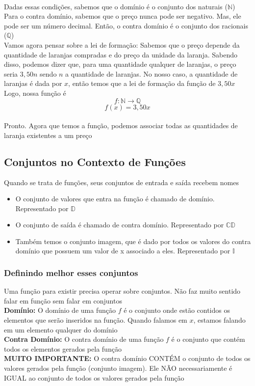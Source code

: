 \documentclass{article}
\begin{document}
\\[2pt]
Dadas essas condições, sabemos que o domínio é o conjunto dos naturais ($\mathbb{N}$)
\\[2pt]
Para o contra domínio, sabemos que o preço nunca pode ser negativo. Mas, ele pode ser um número decimal. Então, o contra domínio é o conjunto dos racionais ($\mathbb{Q}$)
\\[5pt]
Vamos agora pensar sobre a lei de formação: Sabemos que o preço depende da quantidade de laranjas compradas e do preço da unidade da laranja. Sabendo disso, podemos dizer que, para uma quantidade qualquer de laranjas, o preço seria $3,50n$ sendo $n$ a quantidade de laranjas. No nosso caso, a quantidade de laranjas é dada por $x$, então temos que a lei de formação da função de $3,50x$
\\[5pt]
Logo, nossa função é
\[
f: \mathbb{N} \rightarrow \mathbb{Q}
\]
\[
f(x) = 3,50x
\]
\\[5pt]
Pronto. Agora que temos a função, podemos associar todas as quantidades de laranja existentes a um preço

\subsection{Conjuntos no Contexto de Funções}
Quando se trata de funções, seus conjuntos de entrada e saída recebem nomes
\begin{itemize}
    \item O conjunto de valores que entra na função é chamado de domínio. Representado por $\mathbb{D}$

    \item O conjunto de saída é chamado de contra domínio. Representado por $\mathbb{CD}$

    \item Também temos o conjunto imagem, que é dado por todos os valores do contra domínio que possuem um valor de x associado a eles. Representado por $\mathbb{I}$
\end{itemize}

\subsubsection{Definindo melhor esses conjuntos}
Uma função para existir precisa operar sobre conjuntos. Não faz muito sentido falar em função sem falar em conjuntos
\\[5pt]
\textbf{Domínio:} O domínio de uma função $f$ é o conjunto onde estão contidos os elementos que serão inseridos na função. Quando falamos em $x$, estamos falando em um elemento qualquer do domínio
\\[5pt]
\textbf{Contra Domínio:} O contra domínio de uma função $f$ é o conjunto que contém todos os elementos gerados pela função
\\[2pt]
\textbf{MUITO IMPORTANTE:} O contra domínio CONTÉM o conjunto de todos os valores gerados pela função (conjunto imagem). Ele NÃO necessariamente é IGUAL ao conjunto de todos os valores gerados pela função 
\end{document}
